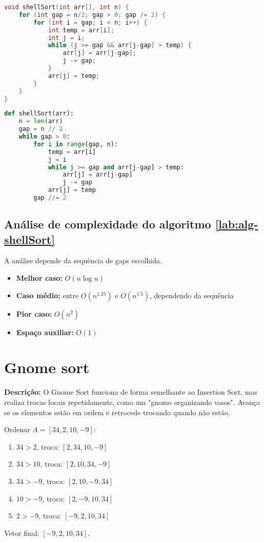 \begin{lstlisting}[language=C,caption={Shell sort em C},captionpos=t]
void shellSort(int arr[], int n) {
    for (int gap = n/2; gap > 0; gap /= 2) {
        for (int i = gap; i < n; i++) {
            int temp = arr[i];
            int j = i;
            while (j >= gap && arr[j-gap] > temp) {
                arr[j] = arr[j-gap];
                j -= gap;
            }
            arr[j] = temp;
        }
    }
}
\end{lstlisting}

\begin{lstlisting}[language=python,caption={Shell sort em Python},captionpos=t]
def shellSort(arr):
    n = len(arr)
    gap = n // 2
    while gap > 0:
        for i in range(gap, n):
            temp = arr[i]
            j = i
            while j >= gap and arr[j-gap] > temp:
                arr[j] = arr[j-gap]
                j -= gap
            arr[j] = temp
        gap //= 2
\end{lstlisting}

\subsection{Análise de complexidade do algoritmo \ref{lab:alg-shellSort}}
A análise depende da sequência de gaps escolhida.
\begin{itemize}
    \item \textbf{Melhor caso:} $O(n \log n)$
    \item \textbf{Caso médio:} entre $O(n^{1.25})$ e $O(n^{1.5})$, dependendo da sequência
    \item \textbf{Pior caso:} $O(n^2)$
    \item \textbf{Espaço auxiliar:} $O(1)$
\end{itemize}


\section{Gnome sort}
\textbf{Descrição:} O Gnome Sort funciona de forma semelhante ao Insertion Sort, mas realiza trocas locais repetidamente, como um "gnomo organizando vasos". Avança se os elementos estão em ordem e retrocede trocando quando não estão.

\begin{exmp}
Ordenar $A = [34, 2, 10, -9]$:

\begin{enumerate}
    \item $34 > 2$, troca: $[2, 34, 10, -9]$
    \item $34 > 10$, troca: $[2, 10, 34, -9]$
    \item $34 > -9$, troca: $[2, 10, -9, 34]$
    \item $10 > -9$, troca: $[2, -9, 10, 34]$
    \item $2 > -9$, troca: $[-9, 2, 10, 34]$
\end{enumerate}
Vetor final: $[-9, 2, 10, 34]$.
\end{exmp}

